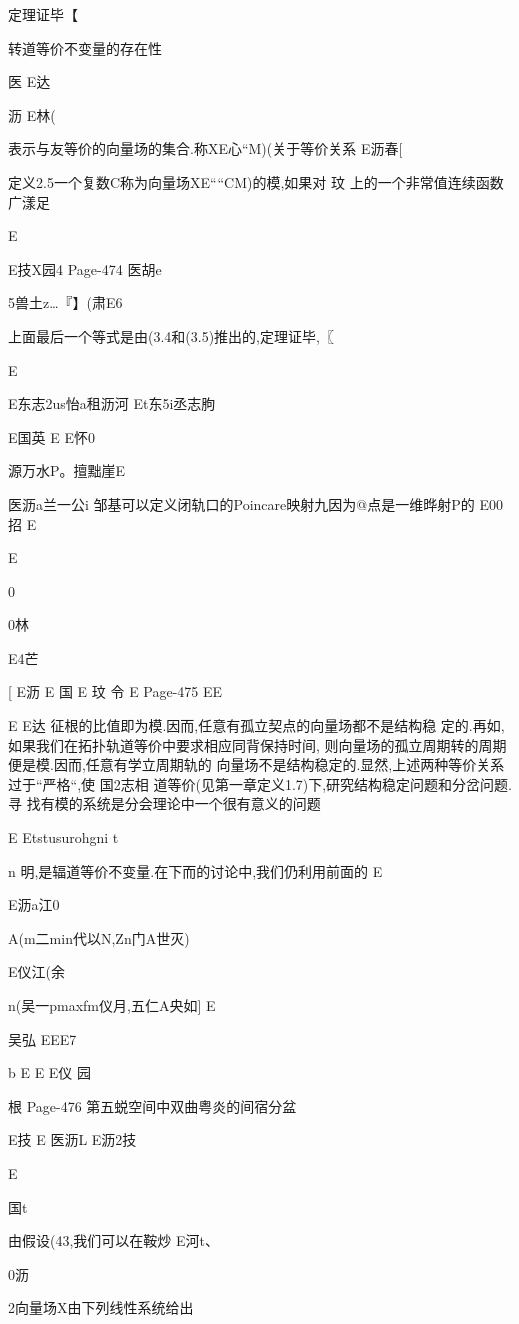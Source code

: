 {{定理证毕【

转道等价不变量的存在性

医
E达

沥
E林(

表示与友等价的向量场的集合.称XE心“M)(关于等价关系
E沥春[

定义2.5一个复数C称为向量场XE““CM)的模,如果对
玟
上的一个非常值连续函数广漾足

E

E技X园4
Page-474
医胡e

5兽土z…『】(肃E6

上面最后一个等式是由(3.4和(3.5)推出的,定理证毕,〖

E

E东志2us怡a租沥河
Et东5i丞志朐

E国英
E
E怀0

源万水P。擅黜崖E

医沥a兰一公i
邹基可以定义闭轨口的Poincare映射九因为@点是一维晔射P的
E00招
E

E

0

0林

E4芒

[
E沥
E
国
E
玟
令
E
Page-475
EE

E
E达
征根的比值即为模.因而,任意有孤立契点的向量场都不是结构稳
定的.再如,如果我们在拓扑轨道等价中要求相应同背保持时间,
则向量场的孤立周期转的周期便是模.因而,任意有学立周期轨的
向量场不是结构稳定的.显然,上述两种等价关系过于“严格“,使
国2志相
道等价(见第一章定义1.7)下,研究结构稳定问题和分岔问题.寻
找有模的系统是分会理论中一个很有意义的问题

E
Etstusurohgni
t

n
明,是辐道等价不变量.在下而的讨论中,我们仍利用前面的
E

E沥a江0

A(m二min代以N,Zn门A世灭)

E仪江(余

n(吴一pmaxfm仪月,五仁A央如]
E

吴弘
EEE7

b
E
E
E仪
园

根
Page-476
第五蜕空间中双曲粤炎的间宿分盆

E技
E
医沥L
E沥2技

E

国t

由假设(43,我们可以在鞍炒%
E河t、

0沥

2向量场X由下列线性系统给出

}}

